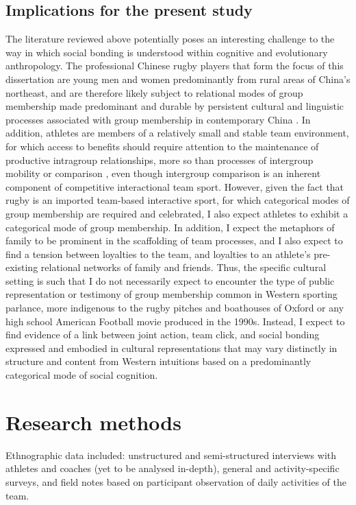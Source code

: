 





\subsection{Implications for the present study}
The literature reviewed above potentially poses an interesting challenge to the way in which social bonding is understood within cognitive and evolutionary anthropology.  The professional Chinese rugby players that form the focus of this dissertation are young men and women predominantly from rural areas of China's northeast, and are therefore likely subject to relational modes of group membership made predominant and durable by persistent cultural and linguistic processes associated with group membership in contemporary China \citep{Liu2009}.  In addition, athletes are members of a relatively small and stable team environment, for which access to benefits should require attention to the maintenance of productive intragroup relationships, more so than processes of intergroup mobility or comparison \citep{Schug2010}, even though intergroup comparison is an inherent component of competitive interactional team sport. However, given the fact that rugby is an imported team-based interactive sport, for which categorical modes of group membership are required and celebrated, I also expect athletes to exhibit a categorical mode of group membership.
In addition, I expect the metaphors of family to be prominent in the scaffolding of team processes, and I also expect to find a tension between loyalties to the team, and loyalties to an athlete's pre-existing relational networks of family and friends\citep{Yang1994}.  Thus, the specific cultural setting is such that I do not necessarily expect to encounter the type of public representation or testimony of group membership common in Western sporting parlance, more indigenous to the rugby pitches and boathouses of Oxford or any high school American Football movie produced in the 1990s.  Instead, I expect to find evidence of a link between joint action, team click, and social bonding expressed and embodied in cultural representations that may vary distinctly in structure and content from Western intuitions based on a predominantly categorical mode of social cognition.




















\section{Research methods}
Ethnographic data included: unstructured and semi-structured interviews with athletes and coaches (yet to be analysed in-depth), general and activity-specific surveys, and field notes based on participant observation of daily activities of the team.
